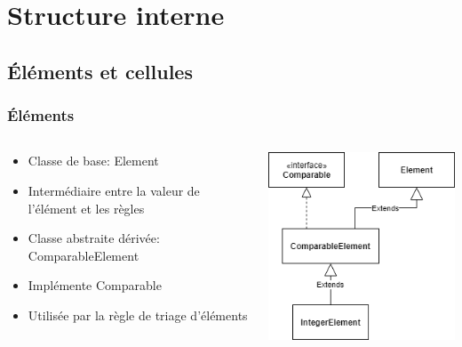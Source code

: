 \documentclass{beamer}
\begin{document}
\section{Structure interne}

\subsection{Éléments et cellules}

\begin{frame}
\frametitle{Éléments}
\begin{columns}

\begin{column}{6cm}
\begin{itemize}
    \item Classe de base: Element
    \item Intermédiaire entre la valeur de l'élément et les règles
\end{itemize}
\begin{itemize}
    \item Classe abstraite dérivée: ComparableElement
    \item Implémente Comparable
    \item Utilisée par la règle de triage d'éléments
\end{itemize}
\end{column}

\begin{column}{6cm}
\begin{center}
\includegraphics[scale=0.4]{img/Element.png}
\end{center}
\end{column}

\end{columns}
\end{frame}
\end{document}
